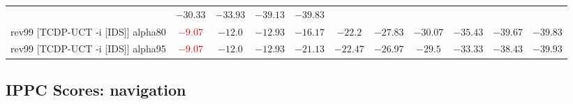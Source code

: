 \documentclass{article}
\begin{document}
\begin{tabular}{|l|r@{$\pm$}rr@{$\pm$}rr@{$\pm$}rr@{$\pm$}rr@{$\pm$}rr@{$\pm$}rr@{$\pm$}rr@{$\pm$}rr@{$\pm$}rr@{$\pm$}r|}
& \multicolumn{2}{c}{$-30.33$}
& \multicolumn{2}{c}{$-33.93$}
& \multicolumn{2}{c}{$-39.13$}
& \multicolumn{2}{c|}{$-39.83$}
\\
rev99 [TCDP-UCT -i [IDS]] alpha80
& \multicolumn{2}{c}{\textbf{\textcolor{red}{$-9.07$}}}
& \multicolumn{2}{c}{$-12.0$}
& \multicolumn{2}{c}{\textbf{$-12.93$}}
& \multicolumn{2}{c}{$-16.17$}
& \multicolumn{2}{c}{$-22.2$}
& \multicolumn{2}{c}{$-27.83$}
& \multicolumn{2}{c}{$-30.07$}
& \multicolumn{2}{c}{$-35.43$}
& \multicolumn{2}{c}{$-39.67$}
& \multicolumn{2}{c|}{$-39.83$}
\\
rev99 [TCDP-UCT -i [IDS]] alpha95
& \multicolumn{2}{c}{\textbf{\textcolor{red}{$-9.07$}}}
& \multicolumn{2}{c}{$-12.0$}
& \multicolumn{2}{c}{\textbf{$-12.93$}}
& \multicolumn{2}{c}{$-21.13$}
& \multicolumn{2}{c}{$-22.47$}
& \multicolumn{2}{c}{$-26.97$}
& \multicolumn{2}{c}{$-29.5$}
& \multicolumn{2}{c}{$-33.33$}
& \multicolumn{2}{c}{$-38.43$}
& \multicolumn{2}{c|}{$-39.93$}
\\
\hline
\end{tabular}%

\bigskip

\subsection*{IPPC Scores: navigation}
\end{document}
